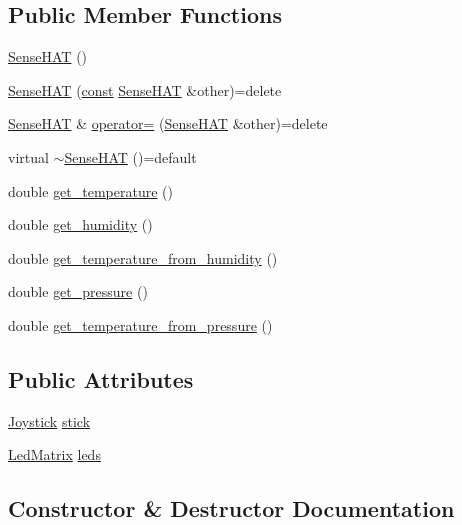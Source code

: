 \subsection*{Public Member Functions}
\begin{DoxyCompactItemize}
\item 
\hyperlink{class_sense_h_a_t_a6f1b370e30d524ee6bccaa19c5566fbe}{Sense\+H\+AT} ()
\item 
\hyperlink{class_sense_h_a_t_a39f7095d97dd434479c05e85bdc32952}{Sense\+H\+AT} (\hyperlink{functions__c_8js_afacfd9c985d225bb07483b887a801b6f}{const} \hyperlink{class_sense_h_a_t}{Sense\+H\+AT} \&other)=delete
\item 
\hyperlink{class_sense_h_a_t}{Sense\+H\+AT} \& \hyperlink{class_sense_h_a_t_aa05efe7c4e0933067e3b655470dfd6df}{operator=} (\hyperlink{class_sense_h_a_t}{Sense\+H\+AT} \&other)=delete
\item 
virtual \hyperlink{class_sense_h_a_t_a1af79051ee9d294203278d8d3f22036a}{$\sim$\+Sense\+H\+AT} ()=default
\item 
double \hyperlink{class_sense_h_a_t_ae0d2f1c110a5dfe453bdb2f22cf719c0}{get\+\_\+temperature} ()
\item 
double \hyperlink{class_sense_h_a_t_a270dbefc2b736c1ef3dfc996f968611f}{get\+\_\+humidity} ()
\item 
double \hyperlink{class_sense_h_a_t_af1ffda111c9826f7eb3b88aa0ea29a00}{get\+\_\+temperature\+\_\+from\+\_\+humidity} ()
\item 
double \hyperlink{class_sense_h_a_t_a6fcb3739537d351a60375a8aa8309a4e}{get\+\_\+pressure} ()
\item 
double \hyperlink{class_sense_h_a_t_abe8f9a29726dbfeac2bd45cff6f8a984}{get\+\_\+temperature\+\_\+from\+\_\+pressure} ()
\end{DoxyCompactItemize}
\subsection*{Public Attributes}
\begin{DoxyCompactItemize}
\item 
\hyperlink{class_joystick}{Joystick} \hyperlink{class_sense_h_a_t_a69d5712bf0663364109f9a482178dc2c}{stick}
\item 
\hyperlink{class_led_matrix}{Led\+Matrix} \hyperlink{class_sense_h_a_t_a09557e42b20ddddc1763917bd36f36a7}{leds}
\end{DoxyCompactItemize}


\subsection{Constructor \& Destructor Documentation}
